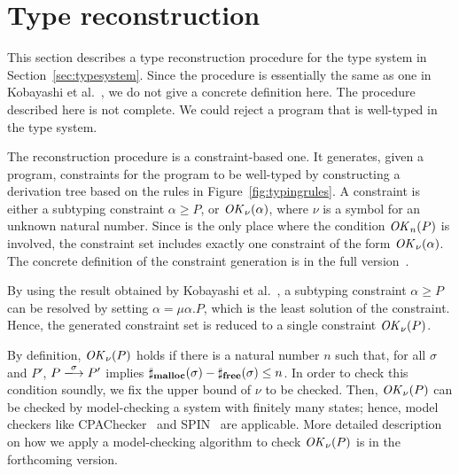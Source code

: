 \section{Type reconstruction}
\label{sec:reconstruction}


This section describes a type reconstruction procedure for the type
system in Section~\ref{sec:typesystem}.  Since the procedure is
essentially the same as one in Kobayashi et
al.~\cite{DBLP:journals/lmcs/KobayashiSW06}, we do not give a concrete
definition here.  The procedure described here is not complete.  We
could reject a program that is well-typed in the type system.

The reconstruction procedure is a constraint-based one.  It generates,
given a program, constraints for the program to be well-typed by
constructing a derivation tree based on the rules in
Figure~\ref{fig:typingrules}.  A constraint is either a subtyping
constraint \(\alpha \ge P\), or \(\mathit{OK}_\nu(\alpha)\), where \(\nu\) is
a symbol for an unknown natural number.  Since  is the only
place where the condition \(\mathit{OK}_n(P)\) is involved, the constraint set
includes exactly one constraint of the form \(\mathit{OK}_\nu(\alpha)\).  The
concrete definition of the constraint generation is in the full
version~\cite{fullversion}.

By using the result obtained by Kobayashi et al.~\cite[Lemma
  3.8]{DBLP:journals/lmcs/KobayashiSW06}, a subtyping constraint
\(\alpha \ge P\) can be resolved by setting \(\alpha = \mu
\alpha. P\), which is the least solution of the constraint.  Hence,
the generated constraint set is reduced to a single constraint
\(\mathit{OK}_{\nu}(P)\).

By definition, \(\mathit{OK}_{\nu}(P)\) holds if there is a natural number
\(n\) such that, for all \(\sigma\) and \(P'\), \(P
\xlongrightarrow{\sigma} P'\) implies \(\sharp_{\mathbf{malloc}}(\sigma) -
\sharp_{\mathbf{free}}(\sigma) \le n\).  In order to check this condition
soundly, we fix the upper bound of \(\nu\) to be checked.  Then,
\(\mathit{OK}_{\nu}(P)\) can be checked by model-checking a system with
finitely many states; hence, model checkers like CPAChecker~\cite{}
and SPIN~\cite{} are applicable.  More detailed description on how we
apply a model-checking algorithm to check \(\mathit{OK}_\nu(P)\) is in the
forthcoming version.

